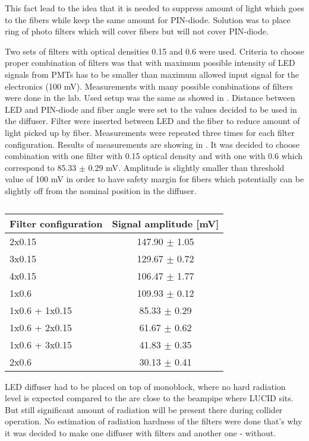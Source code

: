 This fact lead to the idea that it is needed to suppress amount of light which goes to the fibers while keep the same amount for PIN-diode.
Solution was to place ring of photo filters which will cover fibers but will not cover PIN-diode.

Two sets of filters with optical densities 0.15 and 0.6 were used. Criteria to choose proper combination of filters was that 
with maximum possible intensity of LED signals from PMTs has to be smaller than maximum allowed input signal for the electronics (100 mV).
Measurements with many possible combinations of filters were done in the lab.
Used setup was the same as showed in . Distance between LED and PIN-diode and fiber angle were set to the values 
decided to be used in the diffuser. Filter were inserted between LED and the fiber to reduce amount of light picked up by fiber.
Measurements were repeated three times for each filter configuration. Results of measurements are showing in .
It was decided to choose combination with one filter with 0.15 optical density and with one with 0.6 which correspond to 85.33 $\pm$ 0.29 mV.
Amplitude is slightly smaller than threshold value of 100 mV in order to have safety margin for fibers 
which potentially can be slightly off from the nominal position in the diffuser.


\begin{table}[bp]
  \begin{tabular}{l|c}
    Filter configuration & Signal amplitude [mV]\\
    \hline
    2x0.15       	&	147.90	$\pm$	1.05	\\
    3x0.15       	&	129.67	$\pm$	0.72	\\
    4x0.15       	&	106.47	$\pm$	1.77	\\
    1x0.6          	&	109.93	$\pm$	0.12	\\
    1x0.6 + 1x0.15 	&	85.33	$\pm$	0.29	\\
    1x0.6 + 2x0.15 	&	61.67	$\pm$	0.62	\\
    1x0.6 + 3x0.15 	&	41.83	$\pm$	0.35	\\
    2x0.6	        &	30.13	$\pm$	0.41	\\
  \end{tabular}
  \caption{}
  \label{tab:FilterChoice}
\end{table}

LED diffuser had to be placed on top of monoblock, where no hard radiation level is expected compared to the are close to the beampipe where LUCID sits.
But still significant amount of radiation will be present there during collider operation.
No estimation of radiation hardness of the filters were done that's why it was decided to make one diffuser with filters and another one - without.

